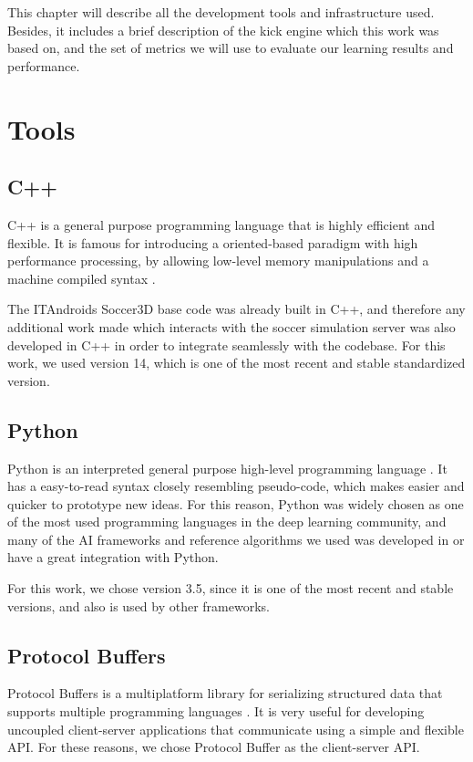 
This chapter will describe all the development tools and infrastructure used. Besides, it includes a brief description of the kick engine which this work was based on, and the set of metrics we will use to evaluate our learning results and performance.

\section{Tools}

\subsection{C++}

C++ is a general purpose programming language that is highly efficient and flexible. It is famous for introducing a oriented-based paradigm with high performance processing, by allowing low-level memory manipulations and a machine compiled syntax \cite{C++}.

The ITAndroids Soccer3D base code was already built in C++, and therefore any additional work made which interacts with the soccer simulation server was also developed in C++ in order to integrate seamlessly with the codebase. For this work, we used version 14, which is one of the most recent and stable standardized version.

\subsection{Python}

Python is an interpreted general purpose high-level programming language \cite{Python}. It has a easy-to-read syntax closely resembling pseudo-code, which makes easier and quicker to prototype new ideas. For this reason, Python was widely chosen as one of the most used programming languages in the deep learning community, and many of the AI frameworks and reference algorithms we used was developed in or have a great integration with Python.

For this work, we chose version 3.5, since it is one of the most recent and stable versions, and also is used by other frameworks.

\subsection{Protocol Buffers}

Protocol Buffers is a multiplatform library for serializing structured data that supports multiple programming languages \cite{ProtoBuf}. It is very useful for developing uncoupled client-server applications that communicate using a simple and flexible API. For these reasons, we chose Protocol Buffer as the client-server API.

